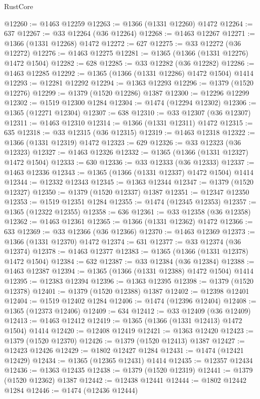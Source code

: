 \begin{lexlean}{RustCore}
\begin{coremodule}
@12260 := @1463 @12259
@12263 := @1366 (@1331 @12260) @1472
@12264 := 637
@12267 := @33 @12264 (@36 @12264)
@12268 := @1463 @12267
@12271 := @1366 (@1331 @12268) @1472
@12272 := 627
@12275 := @33 @12272 (@36 @12272)
@12276 := @1463 @12275
@12281 := @1365 (@1366 (@1331 @12276) @1472 @1504)
@12282 := 628
@12285 := @33 @12282 (@36 @12282)
@12286 := @1463 @12285
@12292 := @1365 (@1366 (@1331 @12286) @1472 @1504) @1414
@12293 := @12281 @12292
@12294 := @1363 @12293
@12296 := @1379 (@1520 @12276)
@12299 := @1379 (@1520 @12286) @1387
@12300 := @12296 @12299
@12302 := @1519 @12300 @1284
@12304 := @1474 (@12294 @12302)
@12306 := @1365 (@12271 @12304)
@12307 := 638
@12310 := @33 @12307 (@36 @12307)
@12311 := @1463 @12310
@12314 := @1366 (@1331 @12311) @1472
@12315 := 635
@12318 := @33 @12315 (@36 @12315)
@12319 := @1463 @12318
@12322 := @1366 (@1331 @12319) @1472
@12323 := 629
@12326 := @33 @12323 (@36 @12323)
@12327 := @1463 @12326
@12332 := @1365 (@1366 (@1331 @12327) @1472 @1504)
@12333 := 630
@12336 := @33 @12333 (@36 @12333)
@12337 := @1463 @12336
@12343 := @1365 (@1366 (@1331 @12337) @1472 @1504) @1414
@12344 := @12332 @12343
@12345 := @1363 @12344
@12347 := @1379 (@1520 @12327)
@12350 := @1379 (@1520 @12337) @1387
@12351 := @12347 @12350
@12353 := @1519 @12351 @1284
@12355 := @1474 (@12345 @12353)
@12357 := @1365 (@12322 @12355)
@12358 := 636
@12361 := @33 @12358 (@36 @12358)
@12362 := @1463 @12361
@12365 := @1366 (@1331 @12362) @1472
@12366 := 633
@12369 := @33 @12366 (@36 @12366)
@12370 := @1463 @12369
@12373 := @1366 (@1331 @12370) @1472
@12374 := 631
@12377 := @33 @12374 (@36 @12374)
@12378 := @1463 @12377
@12383 := @1365 (@1366 (@1331 @12378) @1472 @1504)
@12384 := 632
@12387 := @33 @12384 (@36 @12384)
@12388 := @1463 @12387
@12394 := @1365 (@1366 (@1331 @12388) @1472 @1504) @1414
@12395 := @12383 @12394
@12396 := @1363 @12395
@12398 := @1379 (@1520 @12378)
@12401 := @1379 (@1520 @12388) @1387
@12402 := @12398 @12401
@12404 := @1519 @12402 @1284
@12406 := @1474 (@12396 @12404)
@12408 := @1365 (@12373 @12406)
@12409 := 634
@12412 := @33 @12409 (@36 @12409)
@12413 := @1463 @12412
@12419 := @1365 (@1366 (@1331 @12413) @1472 @1504) @1414
@12420 := @12408 @12419
@12421 := @1363 @12420
@12423 := @1379 (@1520 @12370)
@12426 := @1379 (@1520 @12413) @1387
@12427 := @12423 @12426
@12429 := @1802 @12427 @1284
@12431 := @1474 (@12421 @12429)
@12434 := @1365 (@12365 @12431) @1414
@12435 := @12357 @12434
@12436 := @1363 @12435
@12438 := @1379 (@1520 @12319)
@12441 := @1379 (@1520 @12362) @1387
@12442 := @12438 @12441
@12444 := @1802 @12442 @1284
@12446 := @1474 (@12436 @12444)

\end{coremodule}
\end{lexlean}
